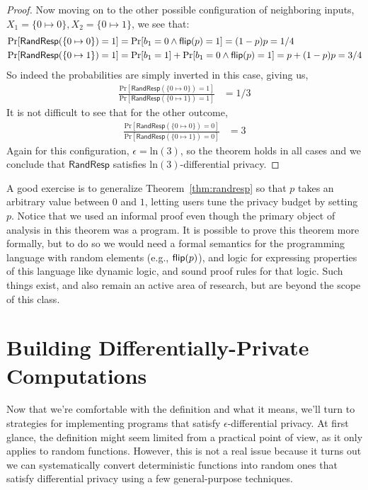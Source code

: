 \documentclass[11pt,twoside]{scrartcl}
\begin{document}
\begin{proof}
Now moving on to the other possible configuration of neighboring inputs, $X_1 = \{0 \mapsto 0\}, X_2 = \{0 \mapsto 1\}$, we see that:
\begin{align*}
\mathrm{Pr}[\mathsf{RandResp}(\{0 \mapsto 0\}) = 1] &= \mathrm{Pr}[b_1 = 0 \land \mathsf{flip}(p) = 1] = (1-p)p  = 1/4 \\
\mathrm{Pr}[\mathsf{RandResp}(\{0 \mapsto 1\}) = 1] &= \mathrm{Pr}[b_1 = 1] + \mathrm{Pr}[b_1 = 0 \land \mathsf{flip}(p) = 1] = p + (1-p)p  = 3/4
\end{align*}
So indeed the probabilities are simply inverted in this case, giving us,
\begin{align*}
\frac{\mathrm{Pr}[\mathsf{RandResp}(\{0 \mapsto 0\}) = 1]}{\mathrm{Pr}[\mathsf{RandResp}(\{0 \mapsto 1\}) = 1]} &=
1/3
\end{align*}
It is not difficult to see that for the other outcome,
\begin{align*}
\frac{\mathrm{Pr}[\mathsf{RandResp}(\{0 \mapsto 0\}) = 0]}{\mathrm{Pr}[\mathsf{RandResp}(\{0 \mapsto 1\}) = 0]} &=
3
\end{align*}
Again for this configuration, $\epsilon = \mathrm{ln}(3)$, so the theorem holds in all cases and we conclude that $\mathsf{RandResp}$ satisfies $\mathrm{ln}(3)$-differential privacy.
\end{proof}

A good exercise is to generalize Theorem~\ref{thm:randresp} so that $p$ takes an arbitrary value between $0$ and $1$, letting users tune the privacy budget by setting $p$. Notice that we used an informal proof even though the primary object of analysis in this theorem was a program. It is possible to prove this theorem more formally, but to do so we would need a formal semantics for the programming language with random elements (e.g., $\mathsf{flip}(p)$), and logic for expressing properties of this language like dynamic logic, and sound proof rules for that logic. Such things exist, and also remain an active area of research, but are beyond the scope of this class.

\section{Building Differentially-Private Computations}

Now that we're comfortable with the definition and what it means, we'll turn to strategies for implementing programs that satisfy $\epsilon$-differential privacy. At first glance, the definition might seem limited from a practical point of view, as it only applies to random functions. However, this is not a real issue because it turns out we can systematically convert deterministic functions into random ones that satisfy differential privacy using a few general-purpose techniques.
\end{document}
